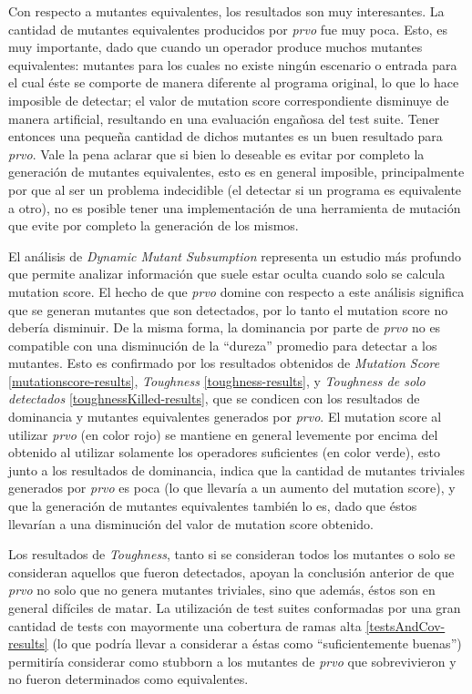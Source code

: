 Con respecto a mutantes equivalentes, los resultados son muy interesantes. La cantidad de mutantes equivalentes producidos por \emph{prvo} fue muy poca. Esto, es muy importante, dado que cuando un operador produce muchos mutantes equivalentes: mutantes para los cuales no existe ning\'un escenario o entrada para el cual \'este se comporte de manera diferente al programa original, lo que lo hace imposible de detectar; el valor de mutation score correspondiente disminuye de manera artificial, resultando en una evaluaci\'on enga\~nosa del test suite. Tener entonces una peque\~na cantidad de dichos mutantes es un buen resultado para \emph{prvo}. Vale la pena aclarar que si bien lo deseable es evitar por completo la generaci\'on de mutantes equivalentes, esto es en general imposible, principalmente por que al ser un problema indecidible (el detectar si un programa es equivalente a otro), no es posible tener una implementaci\'on de una herramienta de mutaci\'on que evite por completo la generaci\'on de los mismos.

El an\'alisis de \emph{Dynamic Mutant Subsumption} representa un estudio m\'as profundo que permite analizar informaci\'on que suele estar oculta cuando solo se calcula mutation score. El hecho de que \emph{prvo} domine con respecto a este an\'alisis significa que se generan mutantes que son detectados, por lo tanto el mutation score no deber\'ia disminuir. De la misma forma, la dominancia por parte de \emph{prvo} no es compatible con una disminuci\'on de la ``dureza'' promedio para detectar a los mutantes. Esto es confirmado por los resultados obtenidos de \emph{Mutation Score} \ref{mutationscore-results}, \emph{Toughness} \ref{toughness-results}, y \emph{Toughness de solo detectados} \ref{toughnessKilled-results}, que se condicen con los resultados de dominancia y mutantes equivalentes generados por \emph{prvo}. El mutation score al utilizar \emph{prvo} (en color rojo) se mantiene en general levemente por encima del obtenido al utilizar solamente los operadores suficientes (en color verde), esto junto a los resultados de dominancia, indica que la cantidad de mutantes triviales generados por \emph{prvo} es poca (lo que llevar\'ia a un aumento del mutation score), y que la generaci\'on de mutantes equivalentes tambi\'en lo es, dado que \'estos llevar\'ian a una disminuci\'on del valor de mutation score obtenido.

Los resultados de \emph{Toughness}, tanto si se consideran todos los mutantes o solo se consideran aquellos que fueron detectados, apoyan la conclusi\'on anterior de que \emph{prvo} no solo que no genera mutantes triviales, sino que adem\'as, \'estos son en general dif\'iciles de matar. La utilizaci\'on de test suites conformadas por una gran cantidad de tests con mayormente una cobertura de ramas alta \ref{testsAndCov-results} (lo que podr\'ia llevar a considerar a \'estas como ``suficientemente buenas'') permitir\'ia considerar como stubborn a los mutantes de \emph{prvo} que sobrevivieron y no fueron determinados como equivalentes.

